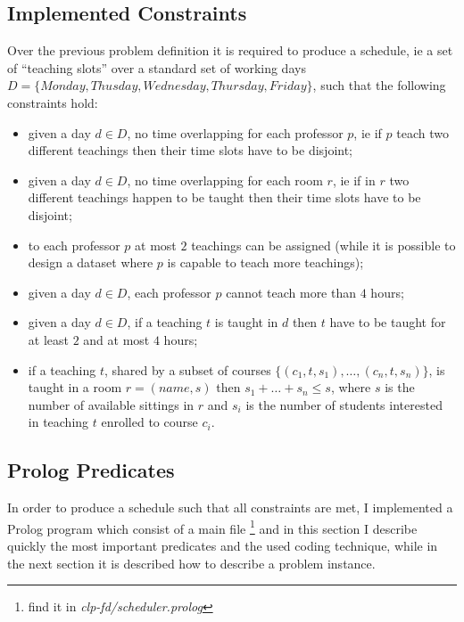 \documentclass[10pt,a4paper]{article} %
\begin{document}
    \subsection{Implemented Constraints}
    Over the previous problem definition it is required to produce a
    schedule, ie a set of ``teaching slots'' over a standard set of
    working days $D = \lbrace Monday, Thusday, Wednesday, Thursday, Friday \rbrace$,
    such that the following constraints hold:
    \begin{itemize}
        \item given a day $d \in D$, no time overlapping for each professor $p$,
            ie if $p$ teach two different teachings then their time slots
            have to be disjoint;
        \item given a day $d \in D$, no time overlapping for each room $r$,
            ie if in $r$ two different teachings happen to be taught then
            their time slots have to be disjoint;
        \item to each professor $p$ at most $2$ teachings can be assigned
            (while it is possible to design a dataset where $p$ is capable
            to teach more teachings);
        \item given a day $d \in D$, each professor $p$ cannot teach more than
           $4$ hours;
        \item given a day $d \in D$, if a teaching $t$ is taught in $d$ then
            $t$ have to be taught for at least $2$ and at most $4$ hours;
        \item if a teaching $t$, shared by a subset of courses
            $\lbrace (c_1, t, s_1), \ldots, (c_n, t, s_n)\rbrace$,
            is taught in a room $r = (name, s)$ then $s_1 + \ldots + s_n \leq s$,
            where $s$ is the number of available sittings in $r$ and
            $s_i$ is the number of students interested in teaching $t$ enrolled
            to course $c_i$.
    \end{itemize}

    \subsection{Prolog Predicates}
    In order to produce a schedule such that all constraints are met, I
    implemented a Prolog program which consist of a main file \footnote{
       find it in \emph{clp-fd/scheduler.prolog}} and in this section I describe
    quickly the most important predicates and the used coding technique, while
    in the next section it is described how to describe a problem instance.
\end{document}
